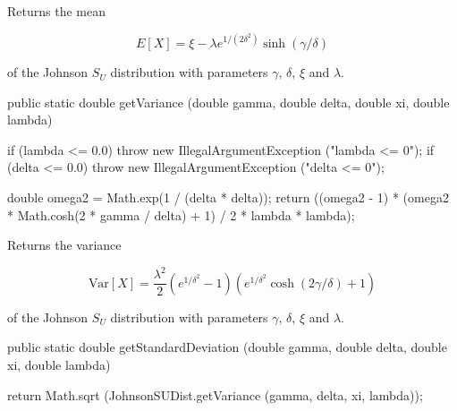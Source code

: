 \begin{tabb}  Returns the mean
\begin{latexonly}
   \[E[X] = \xi - \lambda e^{1/(2\delta^2)} \sinh({\gamma}/{\delta})\]
\end{latexonly}
   of the Johnson $S_U$ distribution with parameters $\gamma$, $\delta$, $\xi$ and $\lambda$.
\end{tabb}
\begin{htmlonly}
\end{htmlonly}
\begin{code}

   public static double getVariance (double gamma, double delta,
                                     double xi, double lambda)\begin{hide} {
      if (lambda <= 0.0)
         throw new IllegalArgumentException ("lambda <= 0");
      if (delta <= 0.0)
         throw new IllegalArgumentException ("delta <= 0");

      double omega2 = Math.exp(1 / (delta * delta));
      return ((omega2 - 1) * (omega2 * Math.cosh(2 * gamma / delta) + 1) / 2 * lambda * lambda);
   }\end{hide}
\end{code}
\begin{tabb}  Returns the variance
\begin{latexonly}
    \[\mbox{Var}[X] = \frac{\lambda^2}{2}
    \left(e^{1/\delta^2} - 1\right)\left(e^{1/\delta^2}
                     \cosh(2 {\gamma}/{\delta}) + 1\right)\]
\end{latexonly}
   of the Johnson $S_U$ distribution with parameters $\gamma$, $\delta$, $\xi$ and $\lambda$.
\end{tabb}
\begin{htmlonly}
\end{htmlonly}
\begin{code}

   public static double getStandardDeviation (double gamma, double delta,
                                              double xi, double lambda)\begin{hide} {
      return Math.sqrt (JohnsonSUDist.getVariance (gamma, delta, xi, lambda));
   }\end{hide}
\end{code}
